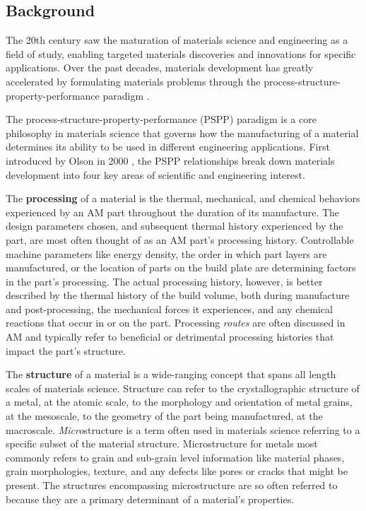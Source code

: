 \subsection{Background}
The 20th century saw the maturation of materials science and engineering as a field of study, enabling targeted materials discoveries and innovations for specific applications. Over the past decades, materials development has greatly accelerated by formulating materials problems through the process-structure-property-performance paradigm \cite{Olson2000, Panchal2013}. 

The process-structure-property-performance (PSPP) paradigm is a core philosophy in materials science that governs how the manufacturing of a material determines its ability to be used in different engineering applications. First introduced by Olson in 2000 \cite{Olson2000}, the PSPP relationships break down materials development into four key areas of scientific and engineering interest.

The \textbf{processing} of a material is the thermal, mechanical, and chemical behaviors experienced by an AM part throughout the duration of its manufacture. The design parameters chosen, and subsequent thermal history experienced by the part, are most often thought of as an AM part's processing history. Controllable machine parameters like energy density, the order in which part layers are manufactured, or the location of parts on the build plate are determining factors in the part's processing. The actual processing history, however, is better described by the thermal history of the build volume, both during manufacture and post-processing, the mechanical forces it experiences, and any chemical reactions that occur in or on the part. Processing \textit{routes} are often discussed in AM and typically refer to beneficial or detrimental processing histories that impact the part's structure.

The \textbf{structure} of a material is a wide-ranging concept that spans all length scales of materials science. Structure can refer to the crystallographic structure of a metal, at the atomic scale, to the morphology and orientation of metal grains, at the mesoscale, to the geometry of the part being manufactured, at the macroscale. \textit{Micro}structure is a term often used in materials science referring to a specific subset of the material structure. Microstructure for metals most commonly refers to grain and sub-grain level information like material phases, grain morphologies, texture, and any defects like pores or cracks that might be present. The structures encompassing microstructure are so often referred to because they are a primary determinant of a material's properties. 

